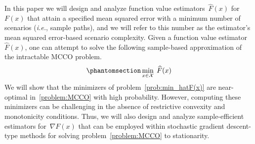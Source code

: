 \documentclass[11pt]{article}
\let\hat\widehat
\begin{document}
In this paper we will design and analyze function value estimators~$\hat{F}(x)$ for~$F(x)$ that attain a specified mean squared error with a minimum number of scenarios ({\em i.e.}, sample paths), and we will refer to this number as the estimator's mean squared error-based scenario complexity.  Given a function value estimator~$\hat F(x)$, one can attempt to solve the following sample-based approximation of the intractable MCCO problem.
\begin{equation}
	\phantomsection \label{prob:min_hatF(x)}
    	\min_{x\in\mathcal{X}}\; \hat F(x)
\end{equation}
We will show that the minimizers of problem~\eqref{prob:min_hatF(x)} are near-optimal in~\eqref{problem:MCCO} with high probability. However, computing these minimizers can be challenging in the absence of restrictive convexity and monotonicity conditions. Thus, we will also design and analyze sample-efficient estimators for~$\nabla F(x)$ that can be employed within stochastic gradient descent-type methods for solving problem~\eqref{problem:MCCO} to stationarity. 
\end{document}
